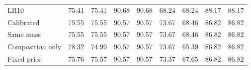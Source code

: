 \begin{table}[ht]
\begin{tabular}{lrrrrrrrr}
LR10 & 75.41 & 75.41 & 90.68 & 90.68 & 68.24 & 68.24 & 88.17 & 88.17 \\
Calibrated & 75.55 & 75.55 & 90.57 & 90.57 & 73.67 & 68.46 & 86.82 & 86.82 \\
Same mass & 75.55 & 75.55 & 90.57 & 90.57 & 73.67 & 68.46 & 86.82 & 86.82 \\
Composition only & 78.32 & 74.99 & 90.57 & 90.57 & 73.67 & 65.39 & 86.82 & 86.82 \\
Fixed prior & 75.76 & 75.57 & 90.57 & 90.57 & 73.37 & 67.65 & 86.82 & 86.82 \\
\bottomrule\end{tabular}
\end{table}
